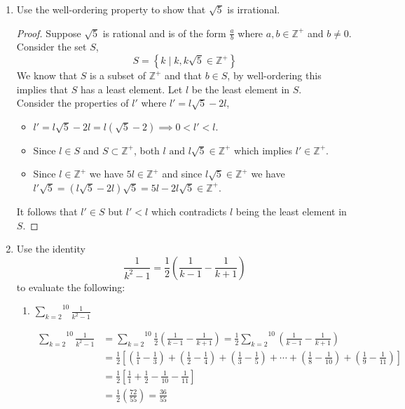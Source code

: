 \documentclass[class=article, crop=false]{standalone}
\def\inlinesum#1#2{\overset{#2}{\underset{#1}{\sum}}}
\begin{document}
\begin{enumerate}
	\item
	  Use the well-ordering property to show that
	  $\sqrt 5$ is irrational.
	  \begin{proof}
		Suppose $\sqrt{5}$ is rational and is of the form $\frac{a}{b}$ where $a,b\in\mathbb{Z}^+$ and $b\neq 0$.
		Consider the set $S$,
		$$S = \left\{ k \mid k, k\sqrt{5}\in\mathbb{Z}^+ \right\}$$
		We know that $S$ is a subset of $\mathbb{Z}^+$ and that $b\in S$, by well-ordering this implies that $S$ has a least element.
		Let $l$ be the least element in $S$.\\
		Consider the properties of $l'$ where $l' = l\sqrt{5}-2l$,
		\begin{itemize}
		  \item $l'=l\sqrt{5}-2l= l(\sqrt{5}-2) \implies 0 < l' < l$.
		  \item Since $l\in S$ and $S\subset \mathbb{Z}^+$, both $l \text{ and }l\sqrt{5}\in\mathbb{Z}^+$ which implies $l'\in\mathbb{Z}^+$.
		  \item Since $l\in\mathbb{Z}^+$ we have $5l\in\mathbb{Z}^+$ and since $l\sqrt{5}\in\mathbb{Z}^+$ we have $l'\sqrt{5}= (l\sqrt{5}-2l)\sqrt{5}= 5l-2l\sqrt{5}\in\mathbb{Z}^+$.
		\end{itemize}
		It follows that $l'\in S$ but $l' < l$ which contradicts $l$ being the least element in $S$.
	  \end{proof}
	  \pagebreak
	
	\item
	  Use the identity
	  $$\frac1{k^2-1}=\frac12\left(\frac1{k-1}-\frac1{k+1}\right)$$
	  to evaluate the following:
	  \begin{enumerate}
	
	  \item
		$\inlinesum{k=2}{10}\frac1{k^2-1}$
	
		\begin{align*}
		  \inlinesum{k=2}{10}\frac{1}{k^2-1} &=\inlinesum{k=2}{10}\frac{1}{2}\left(\frac{1}{k-1}-\frac{1}{k+1}\right)= \frac{1}{2}\inlinesum{k=2}{10}\left(\frac{1}{k-1}-\frac{1}{k+1}\right) \\
		  &= \frac{1}{2}\left[\left(\frac{1}{1}-\frac{1}{3}\right) + \left(\frac{1}{2}-\frac{1}{4}\right) + \left(\frac{1}{3}-\frac{1}{5}\right) + \cdots + \left(\frac{1}{8}-\frac{1}{10}\right) + \left(\frac{1}{9}-\frac{1}{11}\right)\right] \\
		  &= \frac{1}{2}\left[\frac{1}{1} + \frac{1}{2} - \frac{1}{10} - \frac{1}{11}\right] \\
		  &= \frac{1}{2}\left(\frac{72}{55}\right) = \frac{36}{55}
		\end{align*}
	

\end{enumerate}
\end{enumerate}
\end{document}
